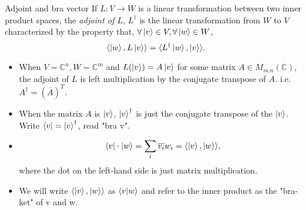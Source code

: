 \documentclass[handout, 10 pt]{beamer}
\begin{document}
\begin{frame}{Adjoint and bra vector}
    If $L:V \to W$ is a linear transformation between two inner product spaces, the {\emph{adjoint of }}$L$, $L^\dagger$ is the linear transformation from $W$ to $V$ characterized by the property that, $\forall \ket{v} \in V, \forall \ket{w} \in W$,
\begin{equation}
    \langle\ket{w}, L\ket{v}\rangle=\langle L^\dagger \ket{w}, \ket{v}\rangle .
\end{equation}
\pause
\begin{itemize}
    \item When $V={\mathbb{C}}^n, W={\mathbb{C}}^m$ and $L(\ket{v})=A\ket{v}$ for some matrix $A \in M_{m.n}(\mathbb{C})$, the adjoint of $L$ is left multiplication by the conjugate transpose of $A$. i.e. $A^\dagger=(\overline{A})^T$.
    \pause
    \item When the matrix $A$ is $\ket{v}$, $\ket{v}^\dagger$ is just the conjugate transpose of the $\ket{v}$. Write $\bra{v}={\ket{v}}^\dagger$, read "bra v".
    \pause
    \item
    \begin{equation}
    \bra{v}\cdot \ket{w}=\sum_i \overline{v_i}w_i=\langle \ket{v},\ket{w}\rangle,
    \end{equation}
    where the dot on the left-hand side is just matrix multiplication.
    \pause
    \item We will write $\langle \ket{v},\ket{w}\rangle$ as $\braket{v|w}$ and refer to the inner product as the "bra-ket" of v and w.
\end{itemize}
\end{frame}
\end{document}
